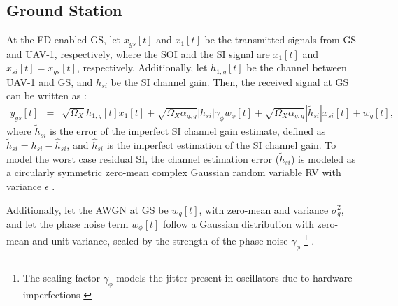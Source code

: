 \subsection{Ground Station}
At the FD-enabled GS, let $x_{gs}[t]$ and $x_1[t]$ be the transmitted signals from GS and UAV-1, respectively, where the SOI and the SI signal are $x_1[t]$ and $x_{si}[t]=x_{gs}[t]$, respectively. Additionally, let $h_{1,g}[t]$ be the channel between UAV-1 and GS, and $h_{si}$ be the SI channel gain. Then, the received signal at GS can be written as \cite{sahai2013impact}:
\begin{eqnarray} \label{JD_HBD_UCS_y_gs}
y_{gs}[t] & = & \sqrt{\Omega_{X}}h_{1,g}[t]x_{1}[t] + \sqrt{\Omega_X\alpha_{g,g}}|h_{si}|\gamma_{\phi}w_{\phi}[t]  + \sqrt{\Omega_X\alpha_{g,g}} |\widetilde{h}_{si}|x_{si}[t] + w_{g}[t],
\end{eqnarray}
where $\widetilde{h}_{si}$ is the error of the imperfect SI channel gain estimate, defined as $\widetilde{h}_{si}=h_{si}-\widehat{h}_{si}$, and $\widehat{h}_{si}$ is the imperfect estimation of the SI channel gain. To model the worst case residual SI, the channel estimation error ($\widetilde{h}_{si}$) is modeled as a circularly symmetric zero-mean complex Gaussian random variable RV with variance $\epsilon$ \cite{zlatanov2017capacity}.

Additionally, let the AWGN at GS be $w_{g}[t]$, with zero-mean and variance $\sigma_g^2$, and let the phase noise term $w_{\phi}[t]$ follow a Gaussian distribution with zero-mean and unit variance, scaled by the strength of the phase noise $\gamma_{\phi}$ \footnote{The scaling factor $\gamma_{\phi}$ models the jitter present in oscillators due to hardware imperfections \cite{sahai2013impact}} \cite{sahai2013impact}. 


